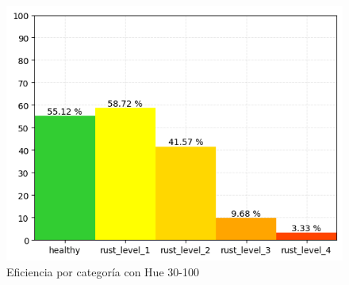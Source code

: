 \begin{figure}
\centering
\includegraphics[scale=0.6]{images/result_classes_30_100.png}
\caption{Eficiencia por categoría con Hue 30-100}
\label{img:efficiency_categories_30_100}
\end{figure}
